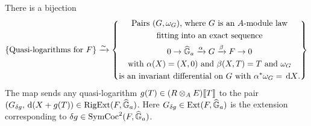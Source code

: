 \documentclass[../main.tex]{subfiles}
\begin{document}
\begin{thm}
  \label{thm:RigExtStr}
  There is a bijection
  \begin{equation}\label{eq:QLogBijection}
    \{\text{Quasi-logarithms for $F$}\} \xrightarrow{\sim} 
      \left\{
      \begin{gathered}
        \text{Pairs $(G, \omega_G)$, where $G$ is an $A$-module law} \\
        \text{fitting into  an exact sequence}
        \\ 0 \to \widehat{\mathbb{G}}_a \xrightarrow{\alpha} G \xrightarrow{\beta} F \to 0 \\
        \text{with $\alpha(X) = (X, 0)$ and $\beta(X, T) = T$ and $\omega_G$} \\
        \text{is an invariant differential on $G$ with 
        $\alpha^* \omega_G = \, \mathrm{d} X$.} \\
      \end{gathered}
      \right\}
  \end{equation}
The map sends any quasi-logarithm $g(T) \in (R\otimes_A E)\llbracket T \rrbracket$
to the pair $(G_{\delta g}, \, \mathrm{d} (X + g(T)) \in \operatorname {RigExt}(F, \widehat{\mathbb{G}}_a)$. Here
$G_{\delta g} \in \operatorname{Ext}(F, \widehat{\mathbb{G}}_a)$ is the extension corresponding to 
$\delta g \in \operatorname{SymCoc}^2(F,\widehat{\mathbb{G}}_a)$. 


\end{thm}
\end{document}
